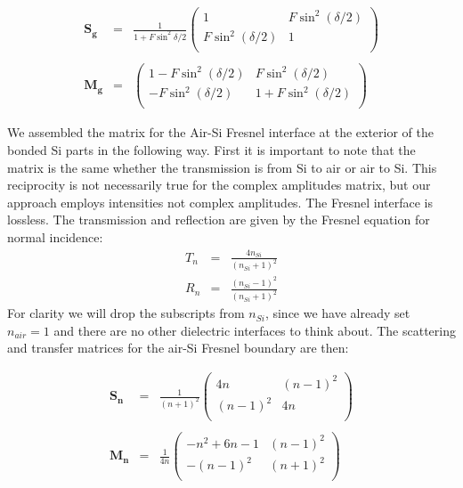 \documentclass[osajnl,preprint,showpacs,superscriptaddress,12pt]{revtex4-1} %
\begin{document}
\begin{eqnarray}
\boldsymbol{S_g}&=&\frac{1}{1+F\sin^2{\delta/2}} \left(
\begin{array}{cc}
1 & F \sin ^2(\delta/2) \\
F \sin ^2(\delta/2) & 1 \\
\end{array}
\right) \nonumber \\
\nonumber \\
\boldsymbol{M_g}&=&\left(
\begin{array}{cc}
 1-F \sin ^2(\delta/2) & F \sin ^2(\delta/2) \\
 -F \sin ^2(\delta/2) & 1+F \sin ^2(\delta/2) \\
\end{array}
\right)
\label{eqn:EtalonMatrix}
\end{eqnarray}

We assembled the matrix for the Air-Si Fresnel interface at the exterior of the bonded Si parts in the following way.  First it is important to note that the matrix is the same whether the transmission is from Si to air or air to Si.  This reciprocity is not necessarily true for the complex amplitudes matrix, but our approach employs intensities not complex amplitudes.  The Fresnel interface is lossless.  The transmission and reflection are given by the Fresnel equation for normal incidence:
\begin{eqnarray}
T_n&=&\frac{4n_{Si}}{(n_{Si}+1)^2} \\
R_n&=&\frac{(n_{Si}-1)^2}{(n_{Si}+1)^2} \label{eq:FresnelTrans}
\end{eqnarray}
For clarity we will drop the subscripts from $n_{Si}$, since we have already set $n_{air}=1$ and there are no other dielectric interfaces to think about.  The scattering and transfer matrices for the air-Si Fresnel boundary are then:

\begin{eqnarray}
\boldsymbol{S_n}&=&\frac{1}{(n+1)^2} \left(
\begin{array}{cc}
4n & (n-1)^2 \\
(n-1)^2 & 4n \\
\end{array}
\right)  \nonumber \\
\nonumber \\
\boldsymbol{M_n}&=&\frac{1}{4n}\left(
\begin{array}{cc}
 -n^2+6  n-1 & ( n-1)^2 \\
 -( n-1)^2 & ( n+1)^2 \\
\end{array}
\right)
\label{eqn:SiAirMatrix}
\end{eqnarray}
\end{document}
